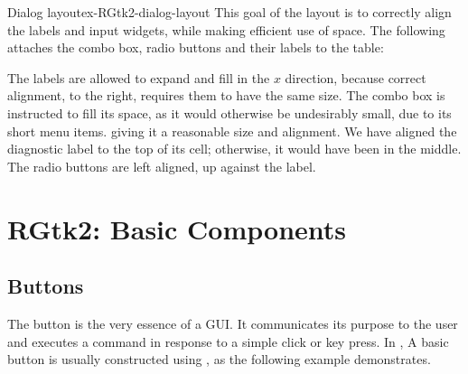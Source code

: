 \begin{example}{Dialog layout}{ex-RGtk2-dialog-layout}
This goal of the layout is to correctly align the labels and input
widgets, while making efficient use of space.  The following
attaches the combo box, radio buttons and their labels to the table:
\begin{Schunk}
\end{Schunk}
%
The labels are allowed to expand and fill in the $x$ direction,
because correct alignment, to the right, requires them to have the
same size. The combo box is instructed to fill its space, as it would
otherwise be undesirably small, due to its short menu items.  giving
it a reasonable size and alignment. We have aligned the diagnostic
label to the top of its cell; otherwise, it would have been in the
middle. The radio buttons are left aligned, up against the label.

\end{example}


\chapter{RGtk2: Basic Components}
\label{sec:basic-components}


\section{Buttons}
\label{sec:RGtk2:gtkButton}

The button is the very essence of a GUI. It communicates its purpose
to the user and executes a command in response to a simple click or
key press. In \GTK\/, A basic button is usually constructed using
, as the following example demonstrates.

